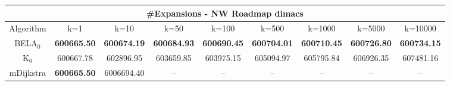 \begin{tabular}{c|cccccccc}\toprule
\multicolumn{9}{c}{#Expansions - NW Roadmap dimacs}\\ \midrule
Algorithm & k=1 & k=10 & k=50 & k=100 & k=500 & k=1000 & k=5000 & k=10000 \\ \midrule
BELA$_0$ & \textbf{600665.50} & \textbf{600674.19} & \textbf{600684.93} & \textbf{600690.45} & \textbf{600704.01} & \textbf{600710.45} & \textbf{600726.80} & \textbf{600734.15} \\
K$_0$ & 600667.78 & 602896.95 & 603659.85 & 603975.15 & 605094.97 & 605795.84 & 606926.35 & 607481.16 \\
mDijkstra & \textbf{600665.50} & 6006694.40 & -- & -- & -- & -- & -- & -- \\ \bottomrule 
\end{tabular}
